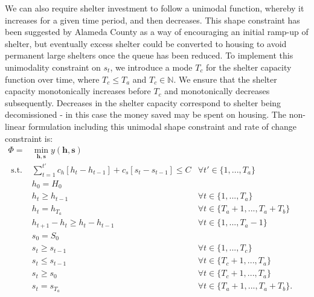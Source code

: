 \documentclass[12pt,a4paper]{article}
\begin{document}
We can also require shelter investment to follow a unimodal function, whereby it increases for a given time period, and then decreases.  This shape constraint has been suggested by Alameda County as a way of encouraging an initial ramp-up of shelter, but eventually excess shelter could be converted to housing to avoid permanent large shelters once the queue has been reduced.  To implement this unimodality constraint on $s_t$, we introduce a mode $T_c$ for the shelter capacity function over time, where $T_c \leq T_a$ and $T_c \in \mathbb{N}$. We ensure that the shelter capacity monotonically increases before $T_c$ and monotonically decreases subsequently. Decreases in the shelter capacity correspond to shelter being decomissioned - in this case the money saved may be spent on housing. The non-linear formulation including this unimodal shape constraint and rate of change constraint is:
%
\begin{eqnarray}
        \Phi = & \min_{\boldsymbol{h},\boldsymbol{s}} y(\boldsymbol{h},\boldsymbol{s})\label{p2c0} & \\
        \text{ s.t. } & \sum_{t=1}^{t'} c_{h}[h_{t}-h_{t-1}] + c_{s}[s_t-s_{t-1}] \leq C & \forall t' \in \{1, ..., T_a\}\,\quad \quad\label{p2c1}\\
        & h_0 = H_0 & \label{p2c2} \\
        & h_{t} \geq h_{t-1} & \forall t \in \{1,...,T_a\}\, \quad \quad\label{p2c3}\\   
        & h_t = h_{T_a} & \forall t \in \{T_a+1,...,T_a+T_b\}\, \quad \quad \label{p2c4} \\
        & h_{t+1} - h_{t} \geq h_{t} - h_{t-1} & \forall t \in \{1,...,T_a-1\}\, \quad \quad\label{p2c5} \\    
        & s_0 = S_0 & \label{p2c6} \\
        & s_{t} \geq s_{t-1} & \forall t \in \{1,...,T_c\}\, \quad \quad\label{p2c7} \\
        & s_{t} \leq s_{t-1} & \forall t \in \{T_c+1,...,T_a\}\, \quad \quad\label{p2c8} \\ 
        & s_t \geq s_0 & \forall t \in \{T_c+1, ..., T_a\}\, \quad \quad \label{p2c9} \\
        & s_t = s_{T_a} & \forall t \in \{T_a+1,...,T_a+T_b\}. \quad \quad \label{p2c10}
\end{eqnarray}
%
\end{document}
